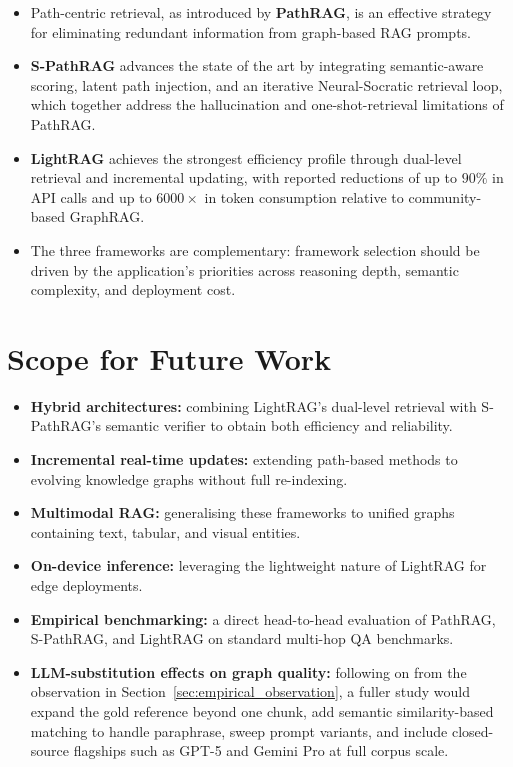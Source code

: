 \documentclass[12pt,a4paper,oneside]{report}
\begin{document}
\begin{itemize}[leftmargin=2em,itemsep=2pt]
    \item Path-centric retrieval, as introduced by \textbf{PathRAG}, is an
          effective strategy for eliminating redundant information from
          graph-based RAG prompts.
    \item \textbf{S-PathRAG} advances the state of the art by integrating
          semantic-aware scoring, latent path injection, and an iterative
          Neural-Socratic retrieval loop, which together address the
          hallucination and one-shot-retrieval limitations of PathRAG.
    \item \textbf{LightRAG} achieves the strongest efficiency profile
          through dual-level retrieval and incremental updating, with
          reported reductions of up to $90\%$ in API calls and up to
          $6000\times$ in token consumption relative to community-based
          GraphRAG.
    \item The three frameworks are complementary: framework selection
          should be driven by the application's priorities across reasoning
          depth, semantic complexity, and deployment cost.
\end{itemize}

\section{Scope for Future Work}
\label{sec:future_work}

\begin{itemize}[leftmargin=2em,itemsep=2pt]
    \item \textbf{Hybrid architectures:} combining LightRAG's dual-level
          retrieval with S-PathRAG's semantic verifier to obtain both
          efficiency and reliability.
    \item \textbf{Incremental real-time updates:} extending path-based
          methods to evolving knowledge graphs without full re-indexing.
    \item \textbf{Multimodal RAG:} generalising these frameworks to unified
          graphs containing text, tabular, and visual entities.
    \item \textbf{On-device inference:} leveraging the lightweight nature of
          LightRAG for edge deployments.
    \item \textbf{Empirical benchmarking:} a direct head-to-head evaluation
          of PathRAG, S-PathRAG, and LightRAG on standard multi-hop QA
          benchmarks.
    \item \textbf{LLM-substitution effects on graph quality:} following on
          from the observation in
          Section~\ref{sec:empirical_observation}, a fuller study would
          expand the gold reference beyond one chunk, add semantic
          similarity-based matching to handle paraphrase, sweep prompt
          variants, and include closed-source flagships such as GPT-5 and
          Gemini Pro at full corpus scale.
\end{itemize}
\end{document}

